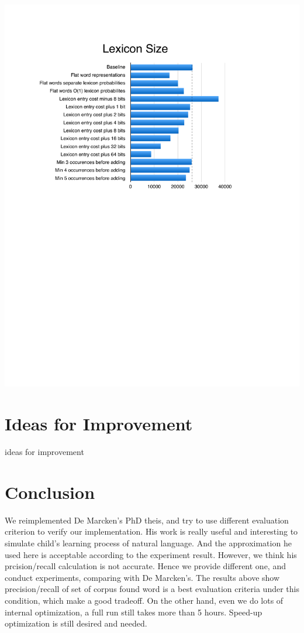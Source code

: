 \documentclass[11pt, oneside, fleqn]{article}
\begin{document}
  \includegraphics{./figure/lexicon_size.pdf}

  \section{Ideas for Improvement}

  ideas for improvement

  \section{Conclusion}

  We reimplemented De Marcken's PhD theis, and try to use different evaluation criterion to verify our implementation. His work is really useful and interesting to simulate child's learning process of natural language. And the approximation he used here is acceptable according to the experiment result. However, we think his prcision/recall calculation is not accurate. Hence we provide different one, and conduct experiments, comparing with De Marcken's. The results above show precision/recall of set of corpus found word is a best evaluation criteria under this condition, which make a good tradeoff. On the other hand, even we do lots of internal optimization, a full run still takes more than 5 hours. Speed-up optimization is still desired and needed. 
\end{document}
